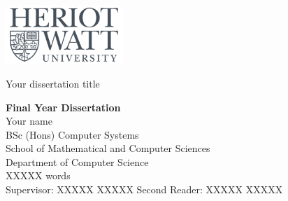 \begin{flushright}
\includegraphics[width=125pt]{Images/hwatt_logo.png}
\end{flushright}

\begin{center}
\vspace*{\fill}
\vspace{3cm}
{\Huge Your dissertation title\par}
\vspace*{\fill}
\vspace{5cm}
{\LARGE \textbf{Final Year Dissertation}}\\
\vspace{0.5cm}
{\Large Your name}\\
{\Large BSc (Hons) Computer Systems}\\
{\Large School of Mathematical and Computer Sciences}\\
{\Large Department of Computer Science}\\
\vspace{1cm}
XXXXX words\\
\vspace{0.5cm}
Supervisor: XXXXX XXXXX \hfill Second Reader: XXXXX XXXXX
\end{center}